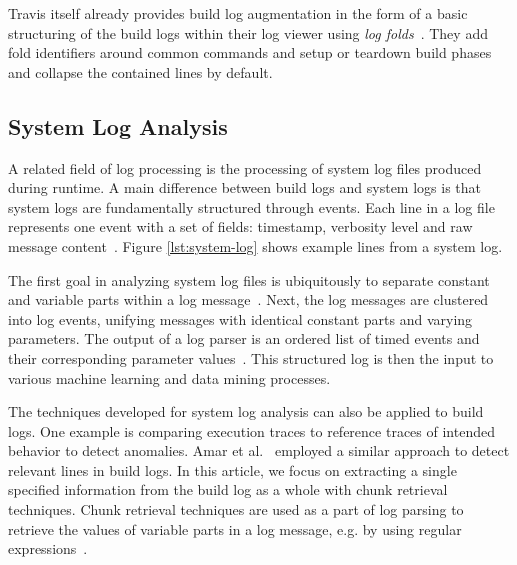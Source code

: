 Travis itself already provides build log augmentation in the form of a
basic structuring of the build logs within their log viewer using
\emph{log folds}~\cite{travis2019logfolds}.
They add fold identifiers
around common commands and setup or teardown build phases and collapse
the contained lines by default.

\subsection{System Log Analysis}
\label{sec:log-analysis}
A related field of log processing is the processing of system log
files produced during runtime.
A main difference between build logs
and system logs is that system logs are fundamentally structured
through events.
Each line in a log file represents one event with a
set of fields: timestamp, verbosity level and raw message
content~\cite{he2017towards}.
Figure \ref{lst:system-log} shows
example lines from a system log.

The first goal in analyzing system log files is ubiquitously to
separate constant and variable parts within a log
message~\cite{nagappan2010abstracting,he2017towards}.
Next, the log
messages are clustered into log events, unifying messages with
identical constant parts and varying parameters.
The output of a log
parser is an ordered list of timed events and their corresponding
parameter values~\cite{he2016evaluation}.
This structured log is then
the input to various machine learning and data mining processes.

The techniques developed for system log analysis can also be applied
to build logs.
One example is comparing execution traces to reference
traces of intended behavior to detect anomalies.
Amar et
al.~\cite{amar2019mining} employed a similar approach to detect
relevant lines in build logs.
In this article, we focus on extracting a single specified information
from the build log as a whole with chunk retrieval techniques.
Chunk
retrieval techniques are used as a part of log parsing to retrieve the
values of variable parts in a log message, e.g.
by using regular
expressions~\cite{nagappan2010abstracting,xu2009detecting}.

